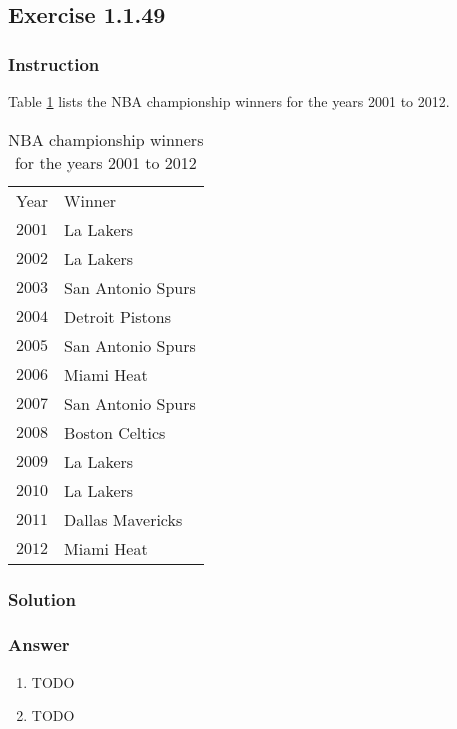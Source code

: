 \subsection*{Exercise 1.1.49}

\subsubsection*{Instruction}

Table \ref{table:exercise-1.1.49} lists the NBA championship winners for the years 2001 to 2012.

\begin{table}[ht]
  \centering
  \begin{tabular}{ l l }
    \hline
    Year & Winner \\
    $ 2001 $ & La Lakers \\
    $ 2002 $ & La Lakers \\
    $ 2003 $ & San Antonio Spurs \\
    $ 2004 $ & Detroit Pistons \\
    $ 2005 $ & San Antonio Spurs \\
    $ 2006 $ & Miami Heat \\
    $ 2007 $ & San Antonio Spurs \\
    $ 2008 $ & Boston Celtics \\
    $ 2009 $ & La Lakers \\
    $ 2010 $ & La Lakers \\
    $ 2011 $ & Dallas Mavericks \\
    $ 2012 $ & Miami Heat \\
    \hline
  \end{tabular}
  \caption{NBA championship winners for the years 2001 to 2012}
  \label{table:exercise-1.1.49}
\end{table}

\subsubsection*{Solution}

\subsubsection*{Answer}

\begin{enumerate}[label = (\alph*)]
  \item
    TODO
  \item
    TODO
\end{enumerate}
